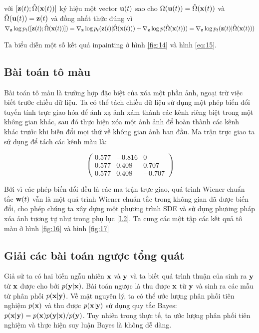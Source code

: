 \documentclass{article} %
\begin{document}
với $[\bold{z}(t); \hat{\Omega}(\bold{x}(t))]$ ký hiệu một vector $\bold{u}(t)$ sao cho $\Omega(\bold{u}(t))=\hat{\Omega}(\bold{x}(t))$ và $\bar{\Omega}(\bold{u}(t))=\bold{z}(t)$ và đồng nhất thức đúng vì $\nabla_{\bold{z}} \log p_t ([\bold{z}(t); \hat{\Omega}(\bold{x}(t))])=\nabla_{\bold{z}} \log p_t (\bold{z}(t) \vert \hat{\Omega}(\bold{x}(t))) + \nabla_{\bold{z}} \log p(\hat{\Omega}(\bold{x}(t)))=\nabla_{\bold{z}} \log p_t (\bold{z}(t) \vert \hat{\Omega}(\bold{x}(t)))$

Ta biểu diễn một số kết quả inpainting ở hình \ref{fig:14} và hình \ref{eq:15}.

\subsection{Bài toán tô màu} \label{I.3}

Bài toán tô màu là trường hợp đặc biệt của xóa một phần ảnh, ngoại trừ việc biết trước chiều dữ liệu.
Ta có thể tách chiều dữ liệu sử dụng một phép biến đổi tuyến tính trực giao hóa để ánh xạ ảnh xám thành các kênh riêng biệt trong một không gian khác, sau đó thực hiện xóa một ảnh ảnh để hoàn thành các kênh khác trước khi biến đổi mọi thứ về không gian ảnh ban đầu.
Ma trận trực giao ta sử dụng để tách các kênh màu là:

\begin{equation*}
    \begin{pmatrix}
        0.577 & -0.816 & 0 \\
        0.577 & 0.408 & 0.707 \\
        0.577 & 0.408 & -0.707
    \end{pmatrix}
\end{equation*}

Bởi vì các phép biến đổi đều là các ma trận trực giao, quá trình Wiener chuẩn tắc $\bold{w}(t)$ vẫn là một quá trình Wiener chuẩn tắc trong không gian đã được biến đổi, cho phép chúng ta xây dựng một phương trình SDE và sử dụng phương pháp xóa ảnh tương tự như trong phụ lục \ref{I.2}.
Ta cung các một tập các kết quả tô màu ở hình \ref{fig:16} và hình \ref{fig:17}

\subsection{Giải các bài toán ngược tổng quát} \label{I.4}

Giả sử ta có hai biến ngẫu nhiên $\bold{x}$ và $\bold{y}$ và ta biết quá trình thuận của sinh ra $\bold{y}$ từ $\bold{x}$ được cho bởi $p(\bold{y} \vert \bold{x})$.
Bài toán ngược là thu được $\bold{x}$ từ $\bold{y}$ và sinh ra các mẫu từ phân phối $p(\bold{x} \vert \bold{y})$.
Về mặt nguyên lý, ta có thể ước lượng phân phối tiên nghiệm $p(\bold{x})$ và thu được $p(\bold{x} \vert \bold{y})$ sử dụng quy tắc Bayes: $p(\bold{x} \vert \bold{y})=p(\bold{x})p(\bold{y} \vert \bold{x}) / p(\bold{y})$.
Tuy nhiên trong thực tế, ta ước lượng phân phối tiên nghiệm và thực hiện suy luận Bayes là không dễ dàng.
\end{document}
